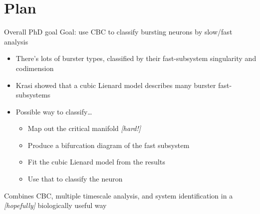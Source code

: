 \documentclass[presentation]{beamer}
\begin{document}
\section{Plan}
\label{sec:org2b1b187}
\begin{frame}[label={sec:orgd768e16}]{Overall PhD goal}
Goal: use CBC to classify bursting neurons by slow/fast analysis
\vfill
\begin{itemize}
\item There's lots of burster types, classified by their fast-subsystem singularity and codimension
\item Krasi showed that a cubic Lienard model describes many burster fast-subsystems
\item Possible way to classify\ldots{}
\begin{itemize}
\item Map out the critical manifold \emph{[hard!]}
\item Produce a bifurcation diagram of the fast subsystem
\item Fit the cubic Lienard model from the results
\item Use that to classify the neuron
\end{itemize}
\end{itemize}
\vfill
Combines CBC, multiple timescale analysis, and system identification in a \emph{[hopefully]} biologically useful way
\end{frame}
\end{document}
